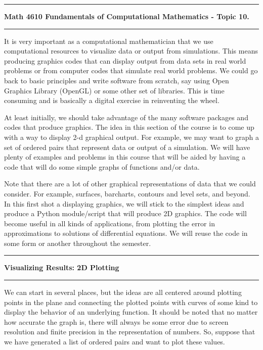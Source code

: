 \documentclass[10pt,fleqn]{article}
\begin{document}
\vskip0.1in\hrule\vskip0.1in \noindent
{\bf Math 4610 Fundamentals of Computational Mathematics  - Topic 10.}
\vskip0.1in\hrule\vskip0.1in \noindent
It is very important as a computational mathematician that we use computational
resources to visualize data or output from simulations. This means producing
graphics codes that can display output from data sets in real world problems or
from computer codes that simulate real world problems. We could go back to basic
principles and write software from scratch, say using Open Graphics Library
(OpenGL) or some other set of libraries. This is time consuming and is basically
a digital exercise in reinventing the wheel.

At least initially, we should take advantage of the many software packages and
codes that produce graphics. The idea in this section of the course is to come
up with a way to display 2-d graphical output. For example, we may want to graph
a set of ordered pairs that represent data or output of a simulation. We will
have plenty of examples and problems in this course that will be aided by having
a code that will do some simple graphs of functions and/or data.

Note that there are a lot of other graphical representations of data that we
could consider. For example, surfaces, barcharts, contours and level sets, and
beyond. In this first shot a displaying graphics, we will stick to the simplest
ideas and produce a Python module/script that will produce 2D graphics. The code
will become useful in all kinds of applications, from plotting the error in 
approximations to solutions of differential equations. We will reuse the code in
some form or another throughout the semester.
\vskip0.1in\hrule\vskip0.1in\noindent
{\bf Visualizing Results: 2D Plotting} 
\vskip0.1in\hrule\vskip0.1in\noindent
We can start in several places, but the ideas are all centered around plotting
points in the plane and connecting the plotted points with curves of some kind
to display the behavior of an underlying function. It should be noted that no
matter how accurate the graph is, there will always be some error due to
screen resolution and finite precision in the representation of numbers. So,
suppose that we have generated a list of ordered pairs and want to plot these
values.
\end{document}
